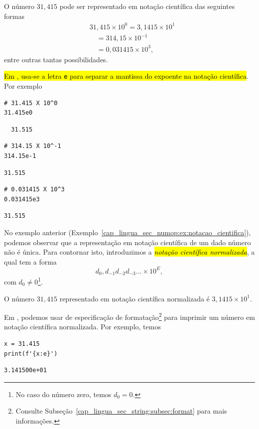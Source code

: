 \begin{ex}\label{cap_lingua_sec_numop:ex:notacao_cientifica}
  O número $31,415$ pode ser representado em notação científica das seguintes formas
  \begin{align}
    & 31,415\times 10^0 = 3,1415\times 10^{1} \\
    & \text{}\quad = 314,15\times 10^{-1} \\
    & \text{}\quad = 0,031415\times 10^{3},
  \end{align}
  entre outras tantas possibilidades.

  \hl{Em {\python}, usa-se a letra \texttt{e} para separar a mantissa do expoente na notação científica}. Por exemplo

\begin{lstlisting}
# 31.415 X 10^0
31.415e0  
\end{lstlisting}

\begin{verbatim}
  31.515
\end{verbatim}

\begin{lstlisting}
# 314.15 X 10^-1
314.15e-1
\end{lstlisting}  

\begin{verbatim}
31.515  
\end{verbatim}

\begin{lstlisting}
# 0.031415 X 10^3
0.031415e3    
\end{lstlisting}

\begin{verbatim}
31.515  
\end{verbatim}
  
\end{ex}

No exemplo anterior (Exemplo~\ref{cap_lingua_sec_numop:ex:notacao_cientifica}), podemos observar que a representação em notação científica de um dado número não é única. Para contornar isto, introduzimos a \hl{\emph{notação científica normalizada}}, a qual tem a forma
\begin{equation}
  d_0,d_{-1}d_{-2}d_{-3}\ldots\times 10^{E},
\end{equation}
com $d_0 \neq 0$\footnote{No caso do número zero, temos $d_0=0$.}.

\begin{ex}
  O número $31,415$ representado em notação científica normalizada é $3,1415\times 10^{1}$.

  Em {\python}, podemos usar de especificação de formatação\footnote{Consulte Subseção~\ref{cap_lingua_sec_string:subsec:format} para mais informações.} para imprimir um número em notação científica normalizada. Por exemplo, temos

\begin{lstlisting}
x = 31.415
print(f'{x:e}')
\end{lstlisting}

\begin{verbatim}
3.141500e+01
\end{verbatim}

\end{ex}


